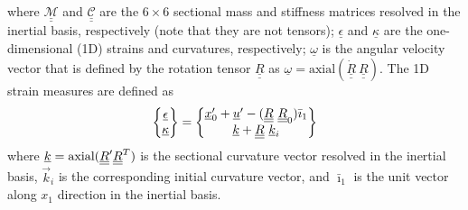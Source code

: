 where $\underline{\underline{\mathcal{M}}}$ and
$\underline{\underline{\mathcal{C}}}$ are the $6 \times 6$ sectional mass
and stiffness matrices resolved in the inertial basis, respectively (note that they are not tensors);
$\underline{\epsilon}$ and $\underline{\kappa}$ are the one-dimensional (1D) strains and
curvatures, respectively; $\underline{\omega}$ is the angular velocity
vector that is defined by the rotation tensor $\underline{\underline{R}}$ as
$\underline{\omega} = \mathrm{axial}(\dot{\underline{\underline{R}}}~\underline{\underline{R}})$. The 1D strain measures are defined as
\begin{equation}
    \label{1DStrain}
    \begin{Bmatrix}
        \underline{\epsilon} \\
        \underline{\kappa}
    \end{Bmatrix}
    =
    \begin{Bmatrix}
        \underline{x}^\prime_0 + \underline{u}^\prime - (\underline{\underline{R}} ~\underline{\underline{R}}_0) \bar{\imath}_1 \\
        \underline{k} + \underline{\underline{R}}~ \underline{k}_i
    \end{Bmatrix}
\end{equation}
where $\underline{k} = \text{axial} (\underline{\underline{R}}^\prime \underline{\underline{R}}^T)$ is the sectional curvature vector resolved in the inertial basis, $\vec{k}_i$ is the corresponding initial curvature vector, and $\bar{\imath}_1$ is the unit vector along $x_1$ direction in the inertial basis. 

